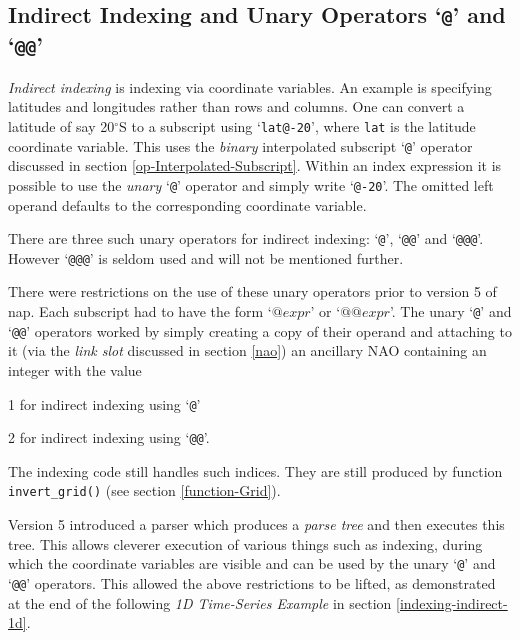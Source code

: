 \subsection{Indirect Indexing and Unary Operators `\texttt{@}' and `\texttt{@@}'}
    \label{indexing-indirect-indexing}

  \emph{Indirect indexing} is indexing via coordinate variables. An
  example is specifying latitudes and longitudes rather than rows and
  columns. One can convert a latitude of say 20$^{\circ}$S to a subscript using
  `\texttt{lat@-20}', where 
  \texttt{lat} is the latitude coordinate variable. This uses the 
  \emph{binary} interpolated subscript `\texttt{@}' operator discussed in section
  \ref{op-Interpolated-Subscript}.
  Within an index expression it is
  possible to use the 
  \emph{unary} `\texttt{@}' operator and simply write
  `\texttt{@-20}'. The omitted left operand defaults to the
  corresponding coordinate variable.
  

There are three such unary operators for indirect indexing: `\texttt{@}',
  `\texttt{@@}' and `\texttt{@@@}'.
However `\texttt{@@@}' is seldom used and will not be mentioned further.
  
There were restrictions on the use of these unary operators prior to version 5 of nap.
Each subscript had to have the form
`$\texttt{@} expr$'
or
`$\texttt{@@} expr$'.
The unary `\texttt{@}' and `\texttt{@@}'
operators worked by simply creating a copy of their operand and attaching to it (via the 
\emph{link slot} discussed in section \ref{nao})
an ancillary NAO containing an integer with the value
\begin{bullets}
  \item 1 for indirect indexing using `\texttt{@}'
  \item 2 for indirect indexing using `\texttt{@@}'.
\end{bullets}

The indexing code still handles such indices.
They are still produced by function \texttt{invert\_grid()} (see section \ref{function-Grid}).

Version 5 introduced a parser which produces a \emph{parse tree} and then executes this tree.
This allows cleverer execution of various things such as indexing, during which the
coordinate variables are visible and can be used by the unary `\texttt{@}'
and `\texttt{@@}' operators.
This allowed the above restrictions to be lifted, as demonstrated at the end of the following 
\emph{1D Time-Series Example}
in section \ref{indexing-indirect-1d}.

